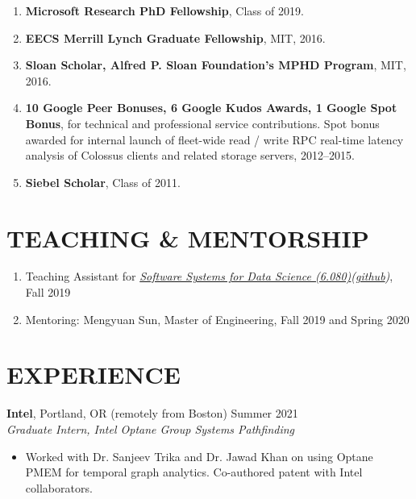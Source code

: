 \documentclass[centered,overlapped]{res}
\begin{document}
\begin{resume}
\begin{enumerate}
  \item \textbf{Microsoft Research PhD Fellowship}, Class of 2019.
  \item \textbf{EECS Merrill Lynch Graduate Fellowship}, MIT, 2016.
  \item \textbf{Sloan Scholar, Alfred P. Sloan Foundation's MPHD Program}, MIT, 2016.
  \item \textbf{10 Google Peer Bonuses, 6 Google Kudos Awards, 1 Google Spot Bonus}, for technical and professional service contributions.  Spot bonus awarded for internal launch of fleet-wide read / write RPC real-time latency analysis of Colossus clients and related storage servers, 2012--2015.
  \item \textbf{Siebel Scholar}, Class of 2011.
\end{enumerate}

\section{TEACHING \& MENTORSHIP}
\begin{enumerate}
  \item Teaching Assistant for {\sl \href{http://dsg.csail.mit.edu/6.S080/}{Software Systems for Data Science (6.080)}(\href{https://github.com/mitdbg/datascienceclass}{github})}, Fall 2019
  \item Mentoring: Mengyuan Sun, Master of Engineering, Fall 2019 and Spring 2020
\end{enumerate}

\section{EXPERIENCE}

  \textbf{Intel}, Portland, OR (remotely from Boston) \hfill Summer 2021 \\
  {\sl Graduate Intern, Intel Optane Group Systems Pathfinding}
  \begin{itemize}
  \item Worked with Dr. Sanjeev Trika and Dr. Jawad Khan on using Optane PMEM for temporal graph analytics. Co-authored patent with Intel collaborators.
  \end{itemize}


\end{resume}
\end{document}
